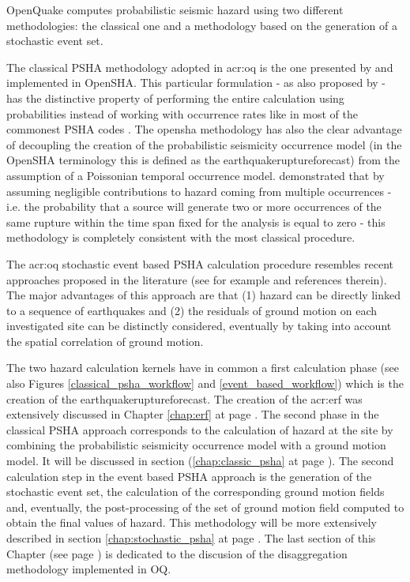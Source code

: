 OpenQuake computes probabilistic seismic hazard using two different 
methodologies: the classical one and a methodology based on the 
generation of a stochastic event set.

The classical PSHA methodology adopted in \gls{acr:oq} is the one 
presented by \citet{field2003} and implemented in OpenSHA. 
This particular formulation - as also proposed by \citet{chiang1984} - 
has the distinctive property of performing the entire calculation using 
probabilities instead of working with occurrence rates like in most 
of the commonest PSHA codes \citep[see for instance][]{bender1987}. 
%
The \gls{opensha} methodology has also the clear advantage of decoupling the 
creation of the probabilistic seismicity occurrence model (in the OpenSHA 
terminology this is defined as the \gls{earthquakeruptureforecast}) from the 
assumption of a Poissonian temporal occurrence model. 
%
\citet{field2003} demonstrated that by assuming negligible contributions to 
hazard coming from multiple occurrences - i.e. the probability that a source 
will generate two or more occurrences of the same rupture within the time 
span fixed for the analysis is equal to zero - this methodology is 
completely consistent with the most classical procedure.

The \gls{acr:oq} stochastic event based PSHA calculation procedure 
resembles recent approaches proposed in the literature (see for example 
\citet{musson2000} and references therein). 
%
The major advantages of this approach are that (1) hazard can be directly 
linked to a sequence of earthquakes and (2) the residuals of ground motion 
on each investigated site can be distinctly considered, eventually by 
taking into account the spatial correlation of ground motion.

The two hazard calculation kernels have in common a first calculation 
phase (see also Figures \ref{classical_psha_workflow} and 
\ref{event_based_workflow}) which is the creation of the 
\gls{earthquakeruptureforecast}. 
The creation of the \gls{acr:erf} was extensively discussed in Chapter 
\ref{chap:erf} at page \pageref{chap:erf}.
%
The second phase in the classical PSHA approach corresponds to the 
calculation of hazard at the site by combining the probabilistic 
seismicity occurrence model with a ground motion model. 
It will be discussed in section (\ref{chap:classic_psha} 
at page \pageref{chap:classic_psha}).
%
The second calculation step in the event based PSHA approach is the 
generation of the stochastic event set, the calculation of the 
corresponding ground motion fields and, eventually, the post-processing 
of the set of ground motion field computed to obtain the final values 
of hazard. This methodology will be more extensively described in section 
\ref{chap:stochastic_psha} at page \pageref{chap:stochastic_psha}.
%
The last section of this Chapter (see page \pageref{sec:disaggregation}) 
is dedicated to the discusion of the disaggregation methodology implemented 
in OQ.